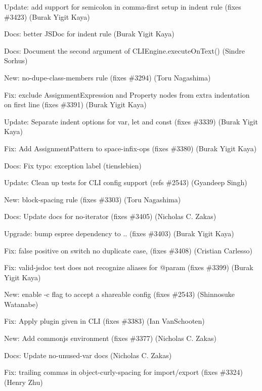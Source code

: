 \begin{DoxyItemize}
\item Update\+: add support for semicolon in comma-\/first setup in indent rule (fixes \#3423) (Burak Yigit Kaya)
\item Docs\+: better J\+S\+Doc for indent rule (Burak Yigit Kaya)
\item Docs\+: Document the second argument of {\ttfamily C\+L\+I\+Engine.\+execute\+On\+Text()} (Sindre Sorhus)
\item New\+: {\ttfamily no-\/dupe-\/class-\/members} rule (fixes \#3294) (Toru Nagashima)
\item Fix\+: exclude {\ttfamily Assignment\+Expression} and {\ttfamily Property} nodes from extra indentation on first line (fixes \#3391) (Burak Yigit Kaya)
\item Update\+: Separate indent options for var, let and const (fixes \#3339) (Burak Yigit Kaya)
\item Fix\+: Add Assignment\+Pattern to space-\/infix-\/ops (fixes \#3380) (Burak Yigit Kaya)
\item Docs\+: Fix typo\+: exception label (tienslebien)
\item Update\+: Clean up tests for C\+LI config support (refs \#2543) (Gyandeep Singh)
\item New\+: {\ttfamily block-\/spacing} rule (fixes \#3303) (Toru Nagashima)
\item Docs\+: Update docs for no-\/iterator (fixes \#3405) (Nicholas C. Zakas)
\item Upgrade\+: bump {\ttfamily espree} dependency to {..} (fixes \#3403) (Burak Yigit Kaya)
\item Fix\+: false positive on switch \textquotesingle{}no duplicate case\textquotesingle{}, (fixes \#3408) (Cristian Carlesso)
\item Fix\+: {\ttfamily valid-\/jsdoc} test does not recognize aliases for {\ttfamily @param} (fixes \#3399) (Burak Yigit Kaya)
\item New\+: enable {\ttfamily -\/c} flag to accept a shareable config (fixes \#2543) (Shinnosuke Watanabe)
\item Fix\+: Apply plugin given in C\+LI (fixes \#3383) (Ian Van\+Schooten)
\item New\+: Add commonjs environment (fixes \#3377) (Nicholas C. Zakas)
\item Docs\+: Update no-\/unused-\/var docs (Nicholas C. Zakas)
\item Fix\+: trailing commas in object-\/curly-\/spacing for import/export (fixes \#3324) (Henry Zhu)

\end{DoxyItemize}
